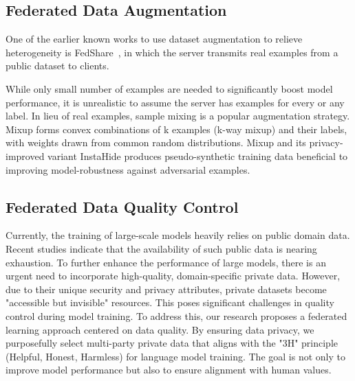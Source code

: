 \documentclass[withindex,glossary,firstyr]{cam-thesis}
\begin{document}
\subsection{Federated Data Augmentation}

One of the earlier known works to use dataset augmentation to relieve heterogeneity is FedShare~\cite{https://doi.org/10.48550/arxiv.1806.00582}, in which the server transmits real examples from a public dataset to clients. 

While only small number of examples are needed to significantly boost model performance, it is unrealistic to assume the server has examples for every or any label. In lieu of real examples, sample mixing is a popular augmentation strategy. Mixup forms convex combinations of k examples (k-way mixup) and their labels, with weights drawn from common random distributions. Mixup and its privacy-improved variant InstaHide produces pseudo-synthetic training data beneficial to improving model-robustness against adversarial examples.


\subsection{Federated Data Quality Control}

Currently, the training of large-scale models heavily relies on public domain data. Recent studies indicate that the availability of such public data is nearing exhaustion. To further enhance the performance of large models, there is an urgent need to incorporate high-quality, domain-specific private data. However, due to their unique security and privacy attributes, private datasets become "accessible but invisible" resources. This poses significant challenges in quality control during model training. To address this, our research proposes a federated learning approach centered on data quality. By ensuring data privacy, we purposefully select multi-party private data that aligns with the "3H" principle (Helpful, Honest, Harmless) for language model training. The goal is not only to improve model performance but also to ensure alignment with human values.
\end{document}
